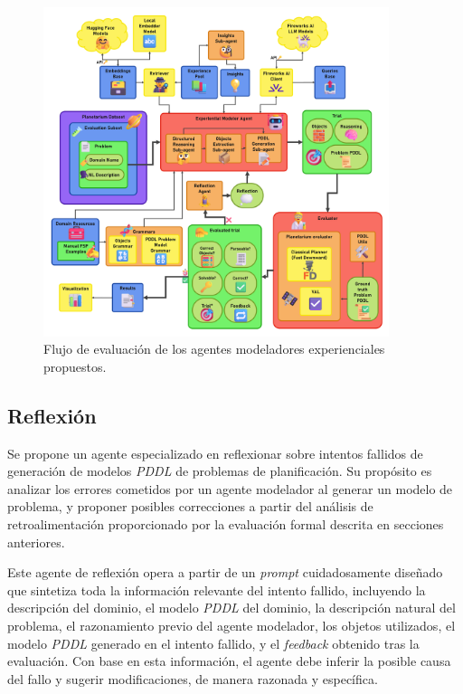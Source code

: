 \begin{figure}[H]
\centering
\includegraphics[width=0.9\textwidth]{Graphics/exp_evaluation.png}
\caption{Flujo de evaluación de los agentes modeladores experienciales propuestos.}
\label{fig:objects}
\end{figure}

\subsection{Reflexión}

Se propone un agente especializado en reflexionar sobre intentos fallidos de generación de modelos \textit{PDDL} de problemas de planificación. Su propósito es analizar los errores cometidos por un agente modelador al generar un modelo de problema, y proponer posibles correcciones a partir del análisis de retroalimentación proporcionado por la evaluación formal descrita en secciones anteriores.

Este agente de reflexión opera a partir de un \textit{prompt} cuidadosamente diseñado que sintetiza toda la información relevante del intento fallido, incluyendo la descripción del dominio, el modelo \textit{PDDL} del dominio, la descripción natural del problema, el razonamiento previo del agente modelador, los objetos utilizados, el modelo \textit{PDDL} generado en el intento fallido, y el \textit{feedback} obtenido tras la evaluación. Con base en esta información, el agente debe inferir la posible causa del fallo y sugerir modificaciones, de manera razonada y específica.

